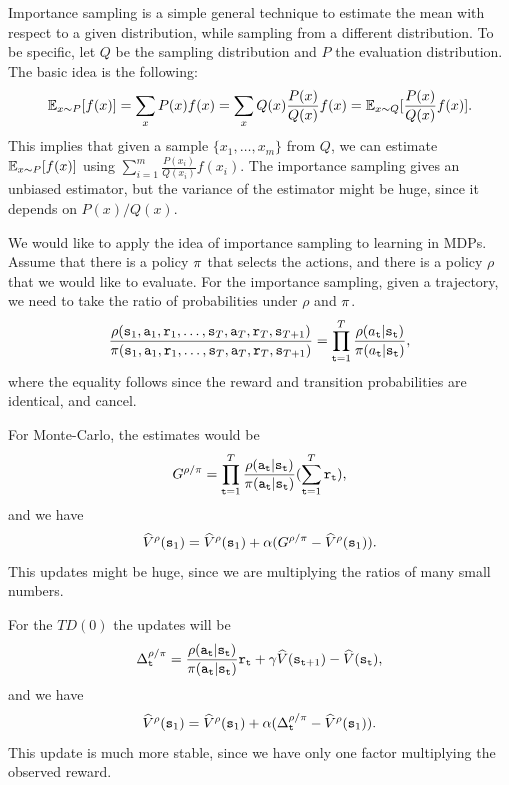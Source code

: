 Importance sampling is a simple general technique to estimate the
mean with respect to a given distribution, while sampling from a
different distribution. To be specific, let $Q$ be the sampling
distribution and $P$ the evaluation distribution. The basic idea is
the following:
\[
\mathbb{E}_{x\sim P}[f(x)]=\sum_x P(x)f(x)=\sum_x Q(x)\frac{P(x)}{Q(x)}
f(x)=\mathbb{E}_{x\sim Q} [\frac{P(x)}{Q(x)}f(x)].
\]
This implies that given a sample $\{x_1, \ldots , x_m\}$ from $Q$,
we can estimate $\mathbb{E}_{x\sim P}[f(x)]$ using $\sum_{i=1}^m
\frac{P(x_i)}{Q(x_i)}f(x_i)$.
%
The importance sampling gives an unbiased estimator, but the
variance of the estimator might be huge, since it depends on
$P(x)/Q(x)$.

We would like to apply the idea of importance sampling to learning
in MDPs. Assume that there is a policy $\pi$ that selects the
actions, and there is a policy $\rho$ that we would like to
evaluate. For the importance sampling, given a trajectory, we need
to take the ratio of probabilities under $\rho$ and $\pi$.
\[
\frac{\rho({\tt s}_1,{\tt a}_1,{\tt r}_1,
\ldots,{\tt s}_{T},{\tt a}_{T},{\tt r}_T,{\tt s}_{T+1})}{\pi({\tt s}_1,{\tt a}_1,{\tt r}_1,
\ldots,{\tt s}_{T},{\tt a}_{T},{\tt r}_T,{\tt s}_{T+1})}=\prod_{{\tt t}=1}^T
\frac{\rho(a_{\tt t}|{\tt s}_{\tt t})}{\pi(a_{\tt t}|{\tt s}_{\tt t})},
\]
where the equality follows since the reward and transition
probabilities are identical, and cancel.

For Monte-Carlo, the estimates would be
\[
G^{\rho/\pi}=\prod_{{\tt t}=1}^T
\frac{\rho({\tt a}_{\tt t}|{\tt s}_{\tt t})}{\pi({\tt a}_{\tt t}|{\tt s}_{\tt t})}
(\sum_{{\tt t}=1}^T {\tt r}_{\tt t}),
\]
and we have
\[
\widehat{V}^\rho ({\tt s}_1) = \widehat{V}^\rho({\tt s}_1) +\alpha(
G^{\rho/\pi}- \widehat{V}^\rho({\tt s}_1)).
\]
This updates might be huge, since we are multiplying the ratios of
many small numbers.

For the $TD(0)$ the updates will be
\[
\Delta^{\rho/\pi}_{\tt t}
=\frac{\rho({\tt a}_{\tt t}|{\tt s}_{\tt t})}{\pi({\tt a}_{\tt t}|{\tt s}_{\tt t})}{\tt r}_{\tt t}
+\gamma \widehat{V}({\tt s}_{{\tt t}+1})-\widehat{V}({\tt s}_{\tt t}),
\]
and we have
\[
\widehat{V}^\rho ({\tt s}_1) = \widehat{V}^\rho({\tt s}_1) +\alpha(
\Delta^{\rho/\pi}_{\tt t}- \widehat{V}^\rho({\tt s}_1)).
\]
This update is much more stable, since we have only one factor
multiplying the observed reward.

